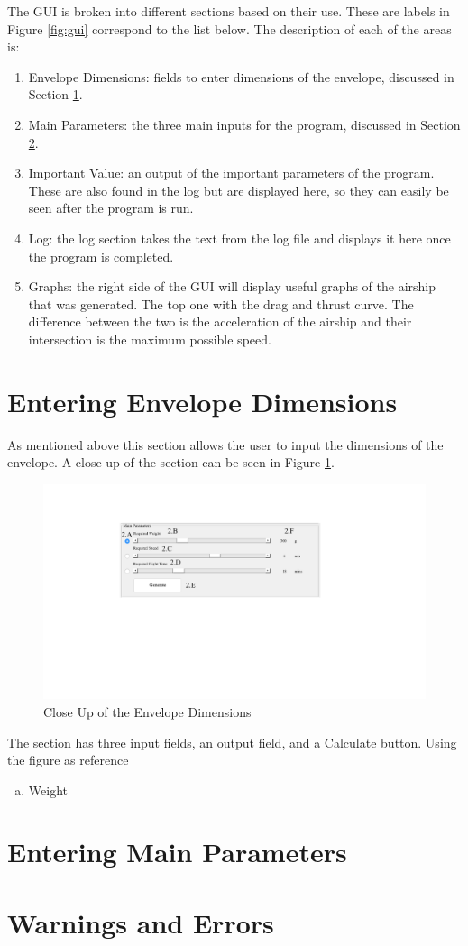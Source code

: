 \documentclass[../main.tex]{subfiles}
\begin{document}
The GUI is broken into different sections based on their use. These are labels in Figure \ref{fig:gui} correspond to the list below. The description of each of the areas is:

\begin{enumerate}
	\item Envelope Dimensions: fields to enter dimensions of the envelope, discussed in Section \ref{gui:envelope}.
	\item Main Parameters: the three main inputs for the program, discussed in Section \ref{gui:parameters}.
	\item Important Value: an output of the important parameters of the program. These are also found in the log but are displayed here, so they can easily be seen after the program is run.
	\item Log: the log section takes the text from the log file and displays it here once the program is completed.
	\item Graphs: the right side of the GUI will display useful graphs of the airship that was generated. The top one with the drag and thrust curve. The difference between the two is the acceleration of the airship and their intersection is the maximum possible speed.
\end{enumerate}

\section{Entering Envelope Dimensions} \label{gui:envelope}
As mentioned above this section allows the user to input the dimensions of the envelope. A close up of the section can be seen in Figure \ref{fig:gui2}.

\begin{figure}[H]
	\centering
	\includegraphics[width=\linewidth]{img/gui/guiSection2.pdf}
	\caption{Close Up of the Envelope Dimensions}
	\label{fig:gui2}
\end{figure}

The section has three input fields, an output field, and a Calculate button. Using the figure as reference

\begin{enumerate}[(a)]
	\item Weight
\end{enumerate}

\section{Entering Main Parameters} \label{gui:parameters}

\section{Warnings and Errors} \label{gui:error}

\pagebreak
\end{document}
